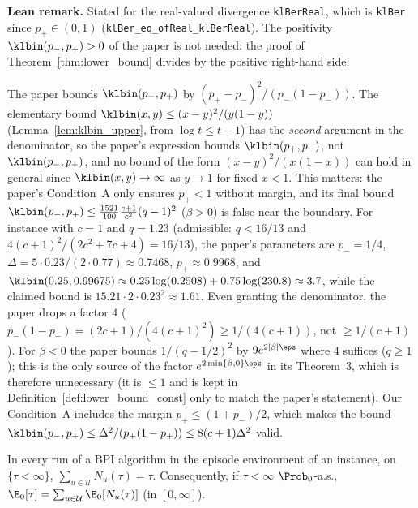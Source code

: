 \textbf{Lean remark.} Stated for the real-valued divergence \texttt{klBerReal}, which is
\texttt{klBer} since $p_+ \in (0, 1)$ (\texttt{klBer\_eq\_ofReal\_klBerReal}). The positivity
$\klbin(p_-, p_+) > 0$ of the paper is not needed: the proof of Theorem~\ref{thm:lower_bound} divides
by the positive right-hand side.

\begin{remark}\label{rem:lb_kl_paper}
The paper bounds $\klbin(p_-,p_+)$ by $(p_+ - p_-)^2/(p_-(1-p_-))$. The elementary bound
$\klbin(x,y) \le (x-y)^2/(y(1-y))$ (Lemma~\ref{lem:klbin_upper}, from $\log t \le t - 1$) has the
\emph{second} argument in the denominator, so the paper's expression bounds $\klbin(p_+, p_-)$,
not $\klbin(p_-, p_+)$, and no bound of the form $(x - y)^2/(x(1-x))$ can hold in general since
$\klbin(x, y) \to \infty$ as $y \to 1$ for fixed $x < 1$. This matters: the paper's Condition~A
only ensures $p_+ < 1$ without margin, and its final bound
$\klbin(p_-,p_+) \le \frac{1521}{100}\frac{c+1}{c^2}(q-1)^2$ ($\beta > 0$) is false near the
boundary. For instance with $c = 1$ and $q = 1.23$ (admissible: $q < 16/13$ and
$4(c+1)^2/(2c^2+7c+4) = 16/13$), the paper's parameters are $p_- = 1/4$,
$\Delta = 5\cdot 0.23/(2\cdot 0.77) \approx 0.7468$, $p_+ \approx 0.9968$, and
$\klbin(0.25, 0.99675) \approx 0.25\log(0.2508) + 0.75\log(230.8) \approx 3.7$, while the claimed
bound is $15.21\cdot 2\cdot 0.23^2 \approx 1.61$. Even granting the denominator, the paper drops
a factor $4$ ($p_-(1-p_-) = (2c+1)/(4(c+1)^2) \ge 1/(4(c+1))$, not $\ge 1/(c+1)$). For $\beta < 0$
the paper bounds $1/(q - 1/2)^2$ by $9e^{2|\beta|\eps}$ where $4$ suffices ($q \ge 1$); this
is the only source of the factor $e^{2\min\{\beta,0\}\eps}$ in its Theorem~3, which is therefore
unnecessary (it is $\le 1$ and is kept in Definition~\ref{def:lower_bound_const} only to match
the paper's statement). Our Condition~A includes the margin $p_+ \le (1+p_-)/2$, which makes
the bound $\klbin(p_-,p_+) \le \Delta^2/(p_+(1-p_+)) \le 8(c+1)\Delta^2$ valid.
\end{remark}

\begin{lemma}\label{lem:hard_count_sum}
\leanok
In every run of a BPI algorithm in the episode environment of an instance, on $\{\tau < \infty\}$,
$\sum_{u \in \mathcal U} N_u(\tau) = \tau$. Consequently, if $\tau < \infty$ $\Prob_0$-a.s.,
$\E_0[\tau] = \sum_{u \in \mathcal U}\E_0[N_u(\tau)]$ (in $[0,\infty]$).
\end{lemma}

